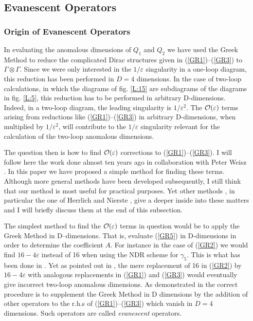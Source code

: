 \documentclass[12pt]{article}
\newcommand{\ord}{{\cal O}}
\begin{document}
\begin{itemize}
\begin{itemize}
\subsection{Evanescent Operators}
\subsubsection{Origin of Evanescent Operators}
In evaluating the anomalous dimensions of $Q_1$ and $Q_2$ we have used
the Greek Method to reduce the complicated Dirac structures given in
(\ref{GR1})--(\ref{GR3}) to $\Gamma\otimes\Gamma$.
 Since we were only
interested in the $1/\varepsilon$ singularity in a one-loop diagram,
this reduction has been performed in $D=4$ dimensions. In the case of
two-loop calculations, in which the diagrams of fig. \ref{L:15} are
subdiagrams of the diagrams in fig. \ref{L:5}, this reduction has to 
be performed in arbitrary
D-dimensions. Indeed, in a two-loop diagram, the leading singularity
is $1/\varepsilon^2$. The $\ord(\varepsilon)$ terms arising from
reductions like (\ref{GR1})--(\ref{GR3}) in arbitrary D-dimensions, 
when multiplied
by $1/\varepsilon^2$, will contribute to the $1/\varepsilon$
singularity relevant for the calculation of the two-loop
anomalous dimensions.

The question then is how to find $\ord(\varepsilon)$ corrections
to (\ref{GR1})--(\ref{GR3}). I will follow here the work done almost 
ten years ago in collaboration with Peter Weisz \cite{WEISZ}. 
In this paper we have
proposed a simple method for finding these terms. Although more
general methods have been developed subsequently, I still think
that our method is most useful for practical purposes. Yet 
other methods \cite{DuGr,HNE,UN95,SH94}, 
in particular the one of Herrlich and Nierste \cite{HNE,UN95,SH94},
give a deeper inside into these matters and I will briefly
discuss them at the end of this subsection.

The simplest method to find the $\ord(\varepsilon)$ terms in question
would be to apply the Greek Method in D--dimensions. That is, evaluate
(\ref{GR5}) in D-dimensions in order to determine the coefficient $A$.
For instance in the case of (\ref{GR2}) we would find $16-4\varepsilon$
 instead of 16 when using the NDR scheme for $\gamma_5$.
This is what has been done in \cite{GREEK}. Yet as pointed out in
\cite{WEISZ}, the mere replacement of 16 in (\ref{GR2}) 
by $16-4\varepsilon$ with
analogous replacements in (\ref{GR1}) and (\ref{GR3}) would eventually 
give incorrect
two-loop anomalous dimensions. As demonstrated in \cite{WEISZ} the
correct procedure is to supplement
the Greek Method in D dimensions  by the
addition of other operators to the r.h.s of (\ref{GR1})--(\ref{GR3})
which vanish in $D=4$ dimensions. Such operators are called
{\it evanescent} operators.


\end{itemize}
\end{itemize}
\end{document}
